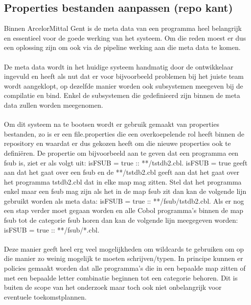 \subsection{Properties bestanden aanpassen (repo kant)}
Binnen ArcelorMittal Gent is de meta data van een programma heel belangrijk en essentieel voor de goede werking van het systeem. Om die reden moest er dus een oplossing zijn om ook via de pipeline werking aan die meta data te komen. 
\\ \\
De meta data wordt in het huidige systeem handmatig door de ontwikkelaar ingevuld en heeft als nut dat er voor bijvoorbeeld problemen bij het juiste team wordt aangeklopt, op dezelfde manier worden ook subsystemen meegeven bij de compilatie en bind. Enkel de subsystemen die gedefinieerd zijn binnen de meta data zullen worden meegenomen. 
\\ \\
Om dit systeem na te bootsen wordt er gebruik gemaakt van properties bestanden, zo is er een file.properties die een overkoepelende rol heeft binnen de repository en waardat er dus gekozen heeft om die nieuwe properties ook te definiëren. De propertie om bijvoorbeeld aan te geven dat een programma een fsub is, ziet er als volgt uit:  isFSUB = true :: **/tstdb2.cbl. isFSUB = true geeft aan dat het gaat over een fsub en de **/tstdb2.cbl geeft aan dat het gaat over het programma tstdb2.cbl dat in elke map mag zitten. Stel dat het programma enkel maar een fsub mag zijn als het in de map fsub zit dan kan de volgende lijn gebruikt worden als meta data: isFSUB = true :: **/fsub/tstdb2.cbl. Als er nog een stap verder moet gegaan worden en alle Cobol programma's binnen de map fsub tot de categorie fsub horen dan kan de volgende lijn meegegeven worden: isFSUB = true :: **/fsub/*.cbl. 
\\ \\
Deze manier geeft heel erg veel mogelijkheden om wildcards te gebruiken om op die manier zo weinig mogelijk te moeten schrijven/typen. In principe kunnen er policies gemaakt worden dat alle programma's die in een bepaalde map zitten of met een bepaalde letter combinatie beginnen tot een categorie behoren. Dit is buiten de scope van het onderzoek maar toch ook niet onbelangrijk voor eventuele toekomstplannen. 



